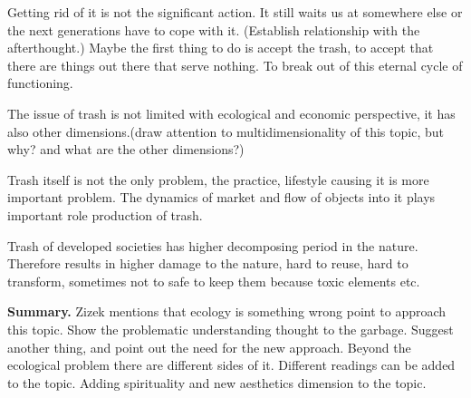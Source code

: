 Getting rid of it is not the significant action. It still waits us at somewhere else or the next generations have to cope with it. (Establish relationship with the afterthought.) Maybe the first thing to do is accept the trash, to accept that there are things out there that serve nothing. To break out of this eternal cycle of functioning.

The issue of trash is not limited with ecological and economic perspective, it has also other dimensions.(draw attention to multidimensionality of this topic, but why? and what are the other dimensions?)

Trash itself is not the only problem, the practice, lifestyle causing it is more important problem. The dynamics of market and flow of objects into it plays important role production of trash.

Trash of developed societies has higher decomposing period in the nature. Therefore results in higher damage to the nature, hard to reuse, hard to transform, sometimes not to safe to keep them because toxic elements etc. 

\textbf{Summary.} Zizek mentions that ecology is something wrong point to approach this topic. Show the problematic understanding thought to the garbage. Suggest another thing, and point out the need for the new approach. Beyond the ecological problem there are different sides of it. Different readings can be added to the topic. Adding spirituality and new aesthetics dimension to the topic. 




